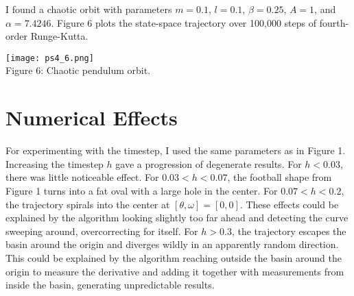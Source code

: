 \documentclass[12pt, letterpaper]{article}
\begin{document}
I found a chaotic orbit with parameters $m=0.1$, $l=0.1$, $\beta=0.25$, $A=1$,
and $\alpha=7.4246$. Figure 6 plots the state-space trajectory over 100,000 
steps of fourth-order Runge-Kutta.

\begin{center}
\texttt{[image: ps4\_6.png]}
\\
Figure 6: Chaotic pendulum orbit.
\end{center}

\section*{Numerical Effects}

For experimenting with the timestep, I used the same parameters as in Figure 1. 
Increasing the timestep $h$ gave a progression of degenerate results. For 
$h<0.03$, there was little noticeable effect. For $0.03 < h < 0.07$, the 
football shape from Figure 1 turns into a fat oval with a large hole in the 
center. For $0.07 < h < 0.2$, the trajectory spirals into the center at 
$[\theta, \omega] = [0,0]$. These effects could be explained by the algorithm
looking slightly too far ahead and detecting the curve sweeping around, 
overcorrecting for itself. For $h > 0.3$, the trajectory escapes the basin 
around the origin and diverges wildly in an apparently random direction. This 
could be explained by the algorithm reaching outside the basin around the origin
to measure the derivative and adding it together with measurements from inside
the basin, generating unpredictable results.
\end{document}
